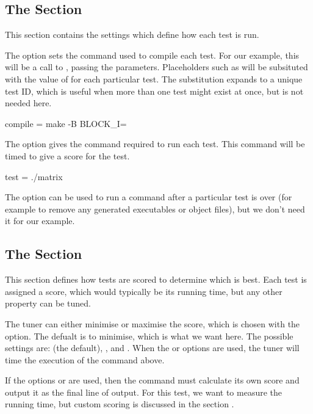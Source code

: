 \documentclass[a4paper]{article}
\begin{document}
\clearpage


\subsection{The \confsnippet{[testing]} Section}
This section contains the settings which define how each test is run.

The  option sets the command used to compile each test. 
For our example, this will be a call to , passing the parameters. 
Placeholders such as  will be subsituted with the 
value of  for each particular test. The substitution 
 expands to a unique test ID, 
which is useful when more than one test might exist at once, but is not 
needed here.
\begin{Code}[numbers=none]
[testing]

compile = make -B BLOCK_I=%
\end{Code}

The  option gives the command required to run each test.
This command will be timed to give a score for the test.
\begin{Code}[numbers=none]
test = ./matrix
\end{Code}

The  option can be used to run a command after a 
particular test is over (for example to remove any generated executables 
or object files), but we don't need it for our example.


\subsection{The \confsnippet{[scoring]} Section}
This section defines how tests are scored to determine which is best. 
Each test is assigned a score, which would typically be its running time, but 
any other property can be tuned.

The tuner can either minimise or maximise the score, which is chosen with the 
 option. The defualt is to minimise, which is what we 
want here. The possible settings are:  (the default), 
,  and . When the 
 or  options are used, 
the tuner will time the execution of the  command above. 

If the options  or  are used, then the 
 command must calculate its own score and output it as the 
final line of output. For this test, we want to measure the running time, but 
custom scoring is discussed in the section \emph{}.
\end{document}
